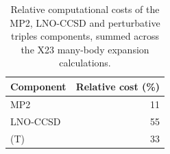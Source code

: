 \begin{table}[h]
\centering
\caption{\label{tab:x23_mbe_relative_cost}Relative computational costs of the MP2, LNO-CCSD and perturbative triples components, summed across the X23 many-body expansion calculations.}
\begin{tabular}{lr}
\toprule
Component & Relative cost (\%) \\ 
\midrule
MP2 & 11 \\
LNO-CCSD & 55 \\
(T) & 33 \\
\bottomrule
\end{tabular}

\end{table}